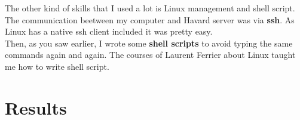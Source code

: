 \documentclass[10pt,a4paper]{article}
\begin{document}
The other kind of skills that I used a lot is Linux management and shell script.\\
The communication beetween my computer and Havard server was via \textbf{ssh}. As Linux has a native ssh client included it was pretty easy.\\
Then, as you saw earlier, I wrote some \textbf{shell scripts} to avoid typing the same commands again and again. The courses of Laurent Ferrier about Linux taught me how to write shell script.


\section{Results}
\end{document}
